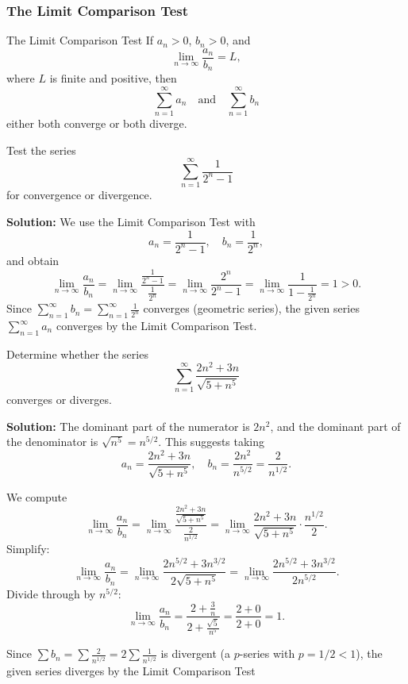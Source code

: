 \documentclass[12pt]{article}
\theoremstyle{beautifulthm}
\begin{document}
\subsubsection{The Limit Comparison Test}

\begin{mytheorem}{The Limit Comparison Test}{}
    If $a_n > 0$, $b_n > 0$, and
\[
\lim_{n \to \infty} \frac{a_n}{b_n} = L,
\]
where $L$ is finite and positive, then
\[
\sum_{n=1}^\infty a_n \quad \text{and} \quad \sum_{n=1}^\infty b_n
\]
either both converge or both diverge.
\end{mytheorem}

\begin{tcolorbox}[colback=examplebg, colframe=red!75!black, title=\textbf{EXAMPLE 3: The Limit Comparison Test}, fonttitle=\bfseries, sharp corners]

Test the series
\[
\sum_{n=1}^\infty \frac{1}{2^n - 1}
\]
for convergence or divergence.

\tcblower
\textbf{Solution:} 
We use the Limit Comparison Test with
\[
a_n = \frac{1}{2^n - 1}, \quad b_n = \frac{1}{2^n},
\]
and obtain
\[
\lim_{n \to \infty} \frac{a_n}{b_n} = \lim_{n \to \infty} \frac{\frac{1}{2^n - 1}}{\frac{1}{2^n}} = \lim_{n \to \infty} \frac{2^n}{2^n - 1} = \lim_{n \to \infty} \frac{1}{1 - \frac{1}{2^n}} = 1 > 0.
\]
Since $\sum_{n=1}^\infty b_n = \sum_{n=1}^\infty \frac{1}{2^n}$ converges (geometric series), the given series $\sum_{n=1}^\infty a_n$ converges by the Limit Comparison Test.
\end{tcolorbox}

\begin{tcolorbox}[colback=examplebg, colframe=red!75!black, title=\textbf{EXAMPLE 4: The Limit Comparison Test}, fonttitle=\bfseries, sharp corners]

Determine whether the series
\[
\sum_{n=1}^\infty \frac{2n^2 + 3n}{\sqrt{5 + n^5}}
\]
converges or diverges.

\tcblower
\textbf{Solution:} 
The dominant part of the numerator is $2n^2$, and the dominant part of the denominator is $\sqrt{n^5} = n^{5/2}$. This suggests taking
\[
a_n = \frac{2n^2 + 3n}{\sqrt{5 + n^5}}, \quad b_n = \frac{2n^2}{n^{5/2}} = \frac{2}{n^{1/2}}.
\]

We compute
\[
\lim_{n \to \infty} \frac{a_n}{b_n} = \lim_{n \to \infty} \frac{\frac{2n^2 + 3n}{\sqrt{5 + n^5}}}{\frac{2}{n^{1/2}}} = \lim_{n \to \infty} \frac{2n^2 + 3n}{\sqrt{5 + n^5}} \cdot \frac{n^{1/2}}{2}.
\]
Simplify:
\[
\lim_{n \to \infty} \frac{a_n}{b_n} = \lim_{n \to \infty} \frac{2n^{5/2} + 3n^{3/2}}{2\sqrt{5 + n^5}} = \lim_{n \to \infty} \frac{2n^{5/2} + 3n^{3/2}}{2n^{5/2}}.
\]
Divide through by $n^{5/2}$:
\[
\lim_{n \to \infty} \frac{a_n}{b_n} = \frac{2 + \frac{3}{n}}{2 + \frac{\sqrt{5}}{n^5}} = \frac{2 + 0}{2 + 0} = 1.
\]

Since $\sum b_n = \sum \frac{2}{n^{1/2}} = 2\sum \frac{1}{n^{1/2}}$ is divergent (a $p$-series with $p = 1/2 < 1$), the given series diverges by the Limit Comparison Test
\end{tcolorbox}
\end{document}
